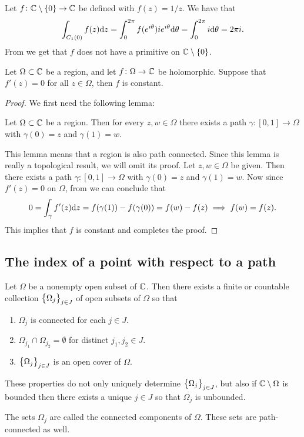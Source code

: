 \documentclass[11pt,a4paper]{article}
\begin{document}
\begin{example}
  Let $f \colon \mathbb{C} \setminus \left\{0\right\} \to \mathbb{C}$ be defined with $f(z) = 1 / z$.
  We have that
  \[
    \int_{C_1(0)} f(z) \mathrm{d} z =
    \int_{0}^{2 \pi} f(e^{i \theta}) i e^{i \theta} \mathrm{d} \theta =
    \int_{0}^{2 \pi} i \mathrm{d} \theta = 2 \pi i.
  \]
  From  we get that $f$ does not have a primitive on
  $\mathbb{C} \setminus \left\{0\right\}$.
\end{example}

\begin{corollary}
  \label{cor:zero-der-implies-const}
  Let $\Omega \subset \mathbb{C}$ be a region, and let $f \colon \Omega \to \mathbb{C}$
  be holomorphic.
  Suppose that $f'(z) = 0$ for all $z \in \Omega$, then $f$ is constant.
\end{corollary}
\begin{proof}
  We first need the following lemma:
  \begin{lemma}
    \label{lem:region-implies-path-connected}
    Let $\Omega \subset \mathbb{C}$ be a region.
    Then for every $z, w \in \Omega$ there exists a path
    $\gamma \colon [0, 1] \to \Omega$ with $\gamma(0) = z$ and $\gamma(1) = w$.
  \end{lemma}
  This lemma means that a region is also path connected.
  Since this lemma is really a topological result, we will omit its proof.
  Let $z,w \in \Omega$ be given.
  Then there exists a path $\gamma \colon [0, 1] \to \Omega$ with
  $\gamma(0) = z$ and $\gamma(1) = w$.
  Now since $f'(z) = 0$ on $\Omega$, from  we can conclude
  that
  \[
    0 = \int_{\gamma} f'(z) \mathrm{d} z = f(\gamma(1)) - f(\gamma(0)) = f(w) - f(z)
    \implies
    f(w) = f(z).
  \]
  This implies that $f$ is constant and completes the proof.
\end{proof}

\subsection{The index of a point with respect to a path}

\begin{lemma}
  Let $\Omega$ be a nonempty open subset of $\mathbb{C}$.
  Then there exists a finite or countable collection $\left\{\Omega_j\right\}_{j \in J}$
  of open subsets of $\Omega$ so that
  \begin{enumerate}
    \item[(1)] $\Omega_j$ is connected for each $j \in J$.
    \item[(2)] $\Omega_{j_1} \cap \Omega_{j_2} = \emptyset$ for distinct
      $j_1, j_2 \in J$.
    \item[(3)] $\left\{\Omega_j\right\}_{j \in J}$ is an open cover of $\Omega$.
  \end{enumerate}
  These properties do not only uniquely determine $\left\{\Omega_j\right\}_{j \in J}$,
  but also if $\mathbb{C} \setminus \Omega$ is bounded then there exists a unique
  $j \in J$ so that $\Omega_j$ is unbounded.
\end{lemma}
\begin{remark}
  The sets $\Omega_j$ are called the connected components of $\Omega$.
  These sets are path-connected as well.
\end{remark}
\end{document}
